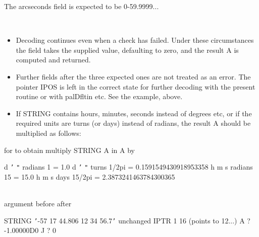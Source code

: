 \documentclass[twoside,11pt]{article}
\renewcommand{\_}{\texttt{\symbol{95}}}
\newcommand{\sstdiytopic}[2]{\item[{\hspace{-0.35em}#1\hspace{-0.35em}:}]
\mbox{} \\[1.3ex] #2}
\newcommand{\sstitemlist}[1]{
  \mbox{} \\
  \vspace{-3.5ex}
  \begin{itemize}
     #1
  \end{itemize}
}
\newcommand{\sstitem}{\item}
\newcommand{\sstdiytopic}[2]{\item[{#1}] #2 }
\newcommand{\sstitemlist}[1]{
      \begin{itemize}
         #1
      \end{itemize}
      \\
   }
\newcommand{\sstitem}{\item}
\begin{document}
{{            The arcseconds field is expected to be 0-59.9999...

      \sstitemlist{

         \sstitem
         Decoding continues even when a check has failed.  Under these
           circumstances the field takes the supplied value, defaulting
           to zero, and the result A is computed and returned.

         \sstitem
         Further fields after the three expected ones are not treated
           as an error.  The pointer IPOS is left in the correct state
           for further decoding with the present routine or with palDfltin
           etc. See the example, above.

         \sstitem
         If STRING contains hours, minutes, seconds instead of degrees
           etc, or if the required units are turns (or days) instead of
           radians, the result A should be multiplied as follows:

      }
            for        to obtain    multiply
            STRING     A in         A by

            d {\tt '} {\tt "}      radians      1       =  1.0
            d {\tt '} {\tt "}      turns        1/2pi   =  0.1591549430918953358
            h m s      radians      15      =  15.0
            h m s      days         15/2pi  =  2.3873241463784300365
   }
   \sstdiytopic{
      Example
   }{
      argument    before                           after

      STRING      {\tt '}-57 17 44.806  12 34 56.7{\tt '}      unchanged
      IPTR        1                                16 (points to 12...)
      A           ?                                -1.00000D0
      J           ?                                0
   }
}
\end{document}

